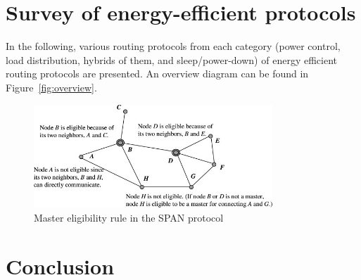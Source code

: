 \documentclass[conference]{IEEEtran}
\begin{document}
\section{Survey of energy-efficient protocols}\label{survey}
In the following, various routing protocols from each category (power control,
load distribution, hybrids of them, and sleep/power-down) of energy
efficient routing protocols are presented. An overview diagram can be found
in Figure~\ref{fig:overview}.


\begin{figure}
\centering
\includegraphics[width=0.8\textwidth]{images/span-master-example}
\caption{Master eligibility rule in the SPAN protocol\cite{alotaibi2012survey}}
\label{spanmaster}
\end{figure}





\section{Conclusion}\label{conclusion}




\end{document}
